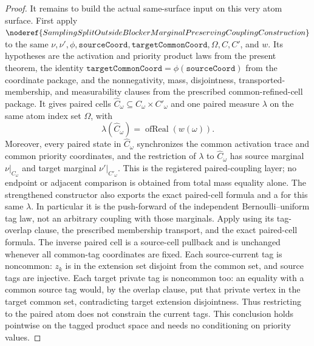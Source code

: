\begin{proof}
It remains to build the actual same-surface input on this very atom surface.
First apply
\(\noderef{SamplingSplitOutsideBlockerMarginalPreservingCouplingConstruction}\)
to the same \(\nu,\nu',\phi,\texttt{sourceCoord},
\texttt{targetCommonCoord},\Omega,C,C'\), and \(w\).  Its hypotheses are
the activation and priority product laws from the present theorem, the
identity
\(\texttt{targetCommonCoord}=\phi(\texttt{sourceCoord})\) from the coordinate
package, and the nonnegativity, mass, disjointness, transported-membership,
and measurability clauses from the prescribed common-refined-cell package.
It gives paired cells
\(\widehat C_\omega\subseteq C_\omega\times C'_\omega\) and one paired
measure \(\lambda\) on the same atom index set \(\Omega\), with
\[
  \lambda(\widehat C_\omega)=\operatorname{ofReal}(w(\omega)).
\]
Moreover, every paired state in \(\widehat C_\omega\) synchronizes the
common activation trace and common priority coordinates, and the restriction
of \(\lambda\) to \(\widehat C_\omega\) has source marginal
\(\nu|_{C_\omega}\) and target marginal \(\nu'|_{C'_\omega}\).  This is the
registered paired-coupling layer; no endpoint or adjacent comparison is
obtained from total mass equality alone.
The strengthened constructor also exports the exact paired-cell formula
and a  for this
same $\lambda$. In particular it is the push-forward of the independent
Bernoulli--uniform tag law, not an arbitrary coupling with those marginals.
Apply 
using its tag-overlap clause, the prescribed membership transport, and the
exact paired-cell formula. The inverse paired cell is a source-cell
pullback and is unchanged whenever all common-tag coordinates are fixed.
Each source-current tag is noncommon: $z_k$ is in the extension set
disjoint from the common set, and source tags are injective. Each target
private tag is noncommon too: an equality with a common source tag would,
by the overlap clause, put that private vertex in the target common set,
contradicting target extension disjointness. Thus restricting to the paired
atom does not constrain the current tags. This conclusion holds pointwise
on the tagged product space and needs no conditioning on priority values.


\end{proof}
